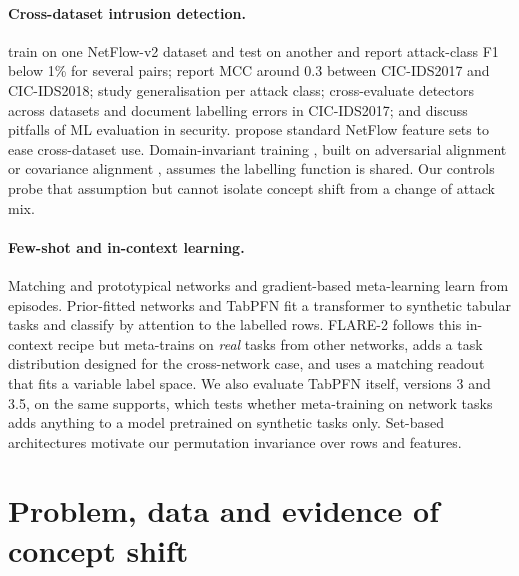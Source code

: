 \documentclass[11pt]{article}
\begin{document}
\paragraph{Cross-dataset intrusion detection.}
\citet{layeghy2023explainable} train on one NetFlow-v2 dataset and test on another and report attack-class F1 below 1\% for several pairs; \citet{cantone2024crossdataset} report MCC around 0.3 between CIC-IDS2017 and CIC-IDS2018; \citet{dhooge2020inter,dhooge2023damaged} study generalisation per attack class; \citet{apruzzese2022cross} cross-evaluate detectors across datasets and \citet{engelen2021troubleshooting} document labelling errors in CIC-IDS2017; \citet{arp2022dos} and \citet{apruzzese2023sok} discuss pitfalls of ML evaluation in security.
\citet{sarhan2022standard} propose standard NetFlow feature sets to ease cross-dataset use.
Domain-invariant training \citep{layeghy2023dinids}, built on adversarial alignment \citep{ganin2016dann} or covariance alignment \citep{sun2016coral}, assumes the labelling function is shared.
Our controls probe that assumption but cannot isolate concept shift from a change of attack mix.
\paragraph{Few-shot and in-context learning.}
Matching and prototypical networks \citep{vinyals2016matching,snell2017prototypical} and gradient-based meta-learning \citep{finn2017maml} learn from episodes.
Prior-fitted networks \citep{muller2022pfn} and TabPFN \citep{hollmann2025tabpfn} fit a transformer to synthetic tabular tasks and classify by attention to the labelled rows.
FLARE-2 follows this in-context recipe but meta-trains on \emph{real} tasks from other networks, adds a task distribution designed for the cross-network case, and uses a matching readout that fits a variable label space.
We also evaluate TabPFN itself, versions 3 and 3.5, on the same supports, which tests whether meta-training on network tasks adds anything to a model pretrained on synthetic tasks only.
Set-based architectures \citep{lee2019settransformer} motivate our permutation invariance over rows and features.

\section{Problem, data and evidence of concept shift}
\end{document}
